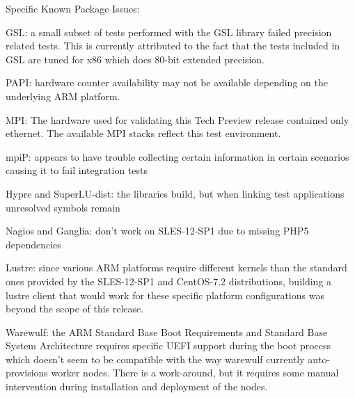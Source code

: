 \noindent Specific Known Package Issues: 
\begin{itemize*}

\item GSL: a small subset of tests performed with the GSL library failed precision
related tests. This is currently attributed to the fact that the tests included
in GSL are tuned for x86 which does 80-bit extended precision.
\item PAPI: hardware counter availability may not be available depending on the
underlying ARM platform.
\item MPI: The hardware used for validating this Tech Preview release contained
only ethernet. The available MPI stacks reflect this test environment.
\item mpiP: appears to have trouble collecting certain information in certain
scenarios causing it to fail integration tests
\item Hypre and SuperLU-dist: the libraries build, but when linking test
applications unresolved symbols remain
\item Nagios and Ganglia: don't work on SLES-12-SP1 due to missing PHP5
dependencies
\item Lustre: since various ARM platforms require different kernels than the
standard ones provided by the SLES-12-SP1 and CentOS-7.2 distributions, 
building a lustre client that would work for these specific platform 
configurations was beyond the scope of this release.
\item Warewulf: the ARM Standard Base Boot Requirements and Standard Base System
Architecture requires specific UEFI support during the boot process which
doesn't seem to be compatible with the way warewulf currently auto-provisions
worker nodes. There is a work-around, but it requires some manual intervention
during installation and deployment of the nodes.
\end{itemize*}

